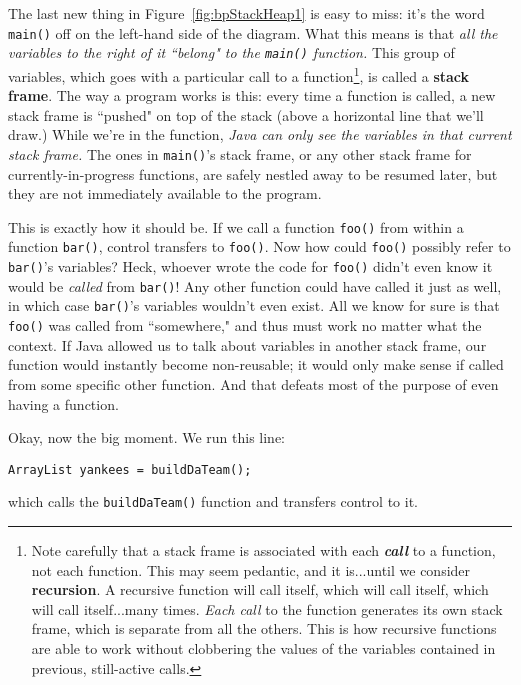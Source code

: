 The last new thing in Figure~\ref{fig:bpStackHeap1} is easy to miss: it's the
word \texttt{main()} off on the left-hand side of the diagram. What this means
is that \textit{all the variables to the right of it ``belong" to the
\texttt{main()} function.} This group of variables, which goes with a
particular call to a function\footnote{Note carefully that a stack frame is
associated with each \textbf{\textit{call}} to a function, not each function.
This may seem pedantic, and it is...until we consider \textbf{recursion}. A
recursive function will call itself, which will call itself, which will call
itself...many times. \textit{Each call} to the function generates its own
stack frame, which is separate from all the others. This is how recursive
functions are able to work without clobbering the values of the variables
contained in previous, still-active calls.}, is called a \textbf{stack frame}.
The way a program works is this: every time a function is called, a new stack
frame is ``pushed" on top of the stack (above a horizontal line that we'll
draw.) While we're in the function, \textit{Java can only see the variables in
that current stack frame.} The ones in \texttt{main()}'s stack frame, or any
other stack frame for currently-in-progress functions, are safely nestled away
to be resumed later, but they are not immediately available to the program.

This is exactly how it should be. If we call a function \texttt{foo()} from
within a function \texttt{bar()}, control transfers to \texttt{foo()}. Now how
could \texttt{foo()} possibly refer to \texttt{bar()}'s variables? Heck,
whoever wrote the code for \texttt{foo()} didn't even know it would be
\textit{called} from \texttt{bar()}! Any other function could have called it
just as well, in which case \texttt{bar()}'s variables wouldn't even exist.
All we know for sure is that \texttt{foo()} was called from ``somewhere," and
thus must work no matter what the context. If Java allowed us to talk about
variables in another stack frame, our function would instantly become
non-reusable; it would only make sense if called from some specific other
function. And that defeats most of the purpose of even having a function.

Okay, now the big moment. We run this line:

\begin{Verbatim}[fontsize=\small,samepage=true]
        ArrayList yankees = buildDaTeam();
\end{Verbatim}

which calls the \texttt{buildDaTeam()} function and transfers control to it.


